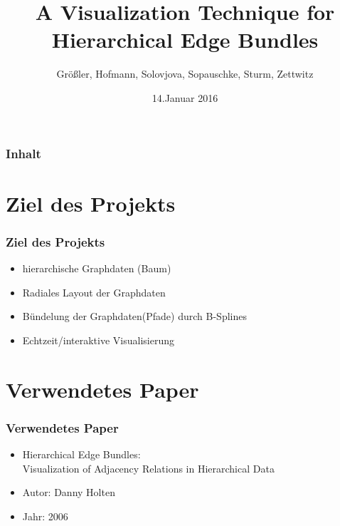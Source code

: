 \documentclass[11pt]{beamer}
\author{Größler, Hofmann, Solovjova, Sopauschke, Sturm, Zettwitz}
\title{A Visualization Technique for \\  Hierarchical Edge Bundles}
\date{14.Januar 2016}
\begin{document}
\begin{frame}
\titlepage
\end{frame}

\begin{frame}
\frametitle{Inhalt} 
\tableofcontents
\end{frame}


\section{Ziel des Projekts}
\begin{frame}
\frametitle{Ziel des Projekts}
\begin{itemize} 
\item hierarchische Graphdaten (Baum)
\item Radiales Layout der Graphdaten
\item Bündelung der Graphdaten(Pfade) durch B-Splines
\item Echtzeit/interaktive Visualisierung
\end{itemize}
\end{frame}

\section{Verwendetes Paper}
\begin{frame}
\frametitle{Verwendetes Paper}
\begin{itemize} 
\item Hierarchical Edge Bundles: \\
Visualization of Adjacency Relations in Hierarchical Data
\item Autor: Danny Holten
\item Jahr: 2006
\end{itemize}
\end{frame}
\end{document}
